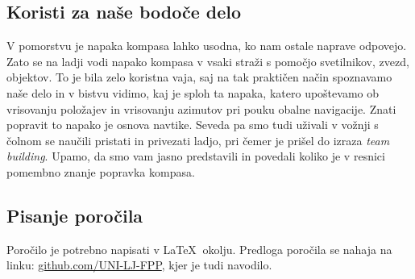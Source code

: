 \subsection{Koristi za naše bodoče delo}
\label{sec:2}
V pomorstvu je napaka kompasa lahko usodna,  ko nam ostale naprave odpovejo. Zato se na ladji vodi napako kompasa v vsaki straži s pomočjo svetilnikov, zvezd, objektov. To je bila zelo koristna vaja, saj na tak praktičen način spoznavamo naše delo in v bistvu vidimo, kaj je sploh ta napaka, katero upoštevamo ob vrisovanju položajev in vrisovanju azimutov pri pouku obalne navigacije. Znati popravit to napako je osnova navtike. Seveda pa smo tudi uživali v vožnji s čolnom se naučili pristati in privezati ladjo, pri čemer je prišel do izraza \textit{team building}. Upamo, da smo vam jasno predstavili in povedali koliko je v resnici pomembno znanje popravka kompasa.

\subsection{Pisanje poročila}
\label{ch:seminar_report_template}
Poročilo je potrebno napisati v \LaTeX $\:$  okolju. Predloga poročila se nahaja na linku: \href{https://github.com/UNI-LJ-FPP/LEN/tree/master/seminar/naloge/template_naloga_XX}{github.com/UNI-LJ-FPP}, kjer je tudi navodilo. 


%
%

%
